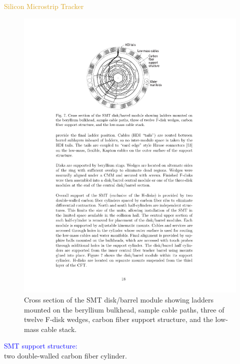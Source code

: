 \begin{frame}{\textcolor{Goldenrod}{Silicon Microstrip Tracker}}
\begin{overlayarea}{\textwidth}{\textheight}
\begin{figure}[h]
      \includegraphics[height=0.34\textheight]{./Images/09_SMT_04}
      \caption*{{\small Cross section of the SMT disk/barrel module showing
            ladders mounted on the beryllium bulkhead, sample cable paths,
            three of twelve F-disk wedges, carbon fiber support structure,
            and the low-mass cable stack.}}
      \end{figure}
    \itt
    \item \textcolor{blue}{SMT support structure:\\}
      two double-walled carbon
      fiber cylinder.
    \tti
\end{overlayarea}
\end{frame}


